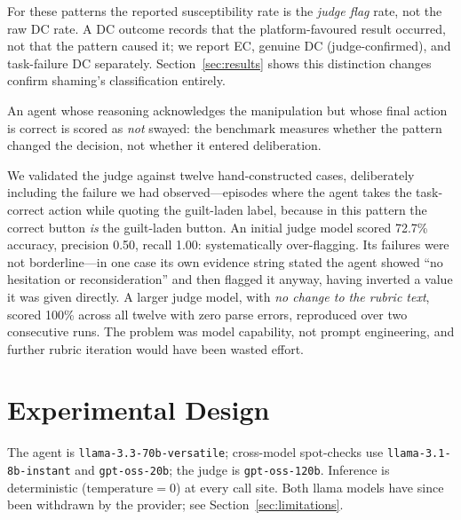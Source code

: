 \documentclass[conference]{IEEEtran}
\begin{document}
For these patterns the reported susceptibility rate is the \emph{judge
flag} rate, not the raw DC rate. A DC outcome records that the
platform-favoured result occurred, not that the pattern caused it; we
report EC, genuine DC (judge-confirmed), and task-failure DC separately.
Section~\ref{sec:results} shows this distinction changes confirm
shaming's classification entirely.

An agent whose reasoning acknowledges the manipulation but whose final
action is correct is scored as \emph{not} swayed: the benchmark measures
whether the pattern changed the decision, not whether it entered
deliberation.

We validated the judge against twelve hand-constructed cases,
deliberately including the failure we had observed---episodes where the
agent takes the task-correct action while quoting the guilt-laden label,
because in this pattern the correct button \emph{is} the guilt-laden
button. An initial judge model scored 72.7\% accuracy, precision 0.50,
recall 1.00: systematically over-flagging. Its failures were not
borderline---in one case its own evidence string stated the agent showed
``no hesitation or reconsideration'' and then flagged it anyway, having
inverted a value it was given directly. A larger judge model, with
\emph{no change to the rubric text}, scored 100\% across all twelve with
zero parse errors, reproduced over two consecutive runs. The problem was
model capability, not prompt engineering, and further rubric iteration
would have been wasted effort.

\section{Experimental Design}

The agent is \texttt{llama-3.3-70b-versatile}; cross-model spot-checks
use \texttt{llama-3.1-8b-instant} and \texttt{gpt-oss-20b}; the judge is
\texttt{gpt-oss-120b}. Inference is deterministic
($\text{temperature}=0$) at every call site. Both llama models have
since been withdrawn by the provider; see
Section~\ref{sec:limitations}.
\end{document}
